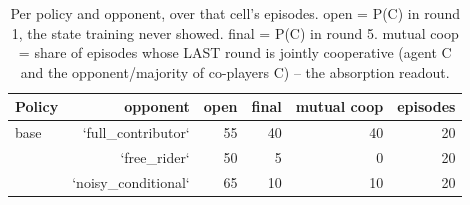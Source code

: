 \begin{table}[t]
\centering
\caption{Per policy and opponent, over that cell's episodes. open = P(C) in round 1, the state training never showed. final = P(C) in round 5. mutual coop = share of episodes whose LAST round is jointly cooperative (agent C and the opponent/majority of co-players C) -- the absorption readout.}
\label{tab:mr-outcomes}
\small
\setlength{\tabcolsep}{3.5pt}
\begin{tabular}{lrrrrr}
\toprule
Policy & opponent & open & final & mutual coop & episodes \\
\midrule
base & `full_contributor` & 55 & 40 & 40 & 20 \\
 & `free_rider` & 50 & 5 & 0 & 20 \\
 & `noisy_conditional` & 65 & 10 & 10 & 20 \\
\bottomrule
\end{tabular}
\end{table}
